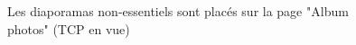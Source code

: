 \documentclass{article}[12pt]
\begin{document}
	    	      \begin{figure}[H]
	    	      	\centering
	    	      	\caption{Les diaporamas non-essentiels sont placés sur la page "Album photos" (TCP en vue)}
	    	      \end{figure}

\end{document}
